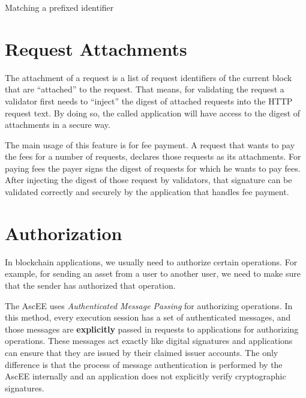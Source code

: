 \begin{algorithm}[h]
    \DontPrintSemicolon
    \BlankLine
    \BlankLine
    {
        {
            \;
        }
    }
    \;
    \caption{Matching a prefixed identifier}\label{alg:match_id}
\end{algorithm}

\section{Request Attachments}\label{sec:attachments}

The attachment of a request is a list of request identifiers of the current block that are ``attached'' to the request.
That means, for validating the request a validator first needs to ``inject'' the digest of attached requests into the
HTTP request text. By doing so, the called application will have access to the digest of attachments in a secure way.

The main usage of this feature is for fee payment. A request that wants to pay the fees for a number of requests,
declares those requests as its attachments. For paying fees the payer signs the digest of requests for which he
wants to pay fees. After injecting the digest of those request by validators, that signature can be validated
correctly and securely by the application that handles fee payment.


\section{Authorization}\label{sec:auth}

In blockchain applications, we usually need to authorize certain operations. For example, for sending an asset
from a user to another user, we need to make sure that the sender has authorized that operation.

The AscEE uses \emph{Authenticated Message Passing} for authorizing operations. In this method, every execution
session has a set of authenticated messages, and those messages are \textbf{explicitly} passed in requests to
applications for authorizing operations. These messages act exactly like digital signatures and applications can
ensure that they are issued by their claimed issuer accounts. The only difference is that the process of
message authentication is performed by the AscEE internally and an application does not explicitly verify cryptographic
signatures.

